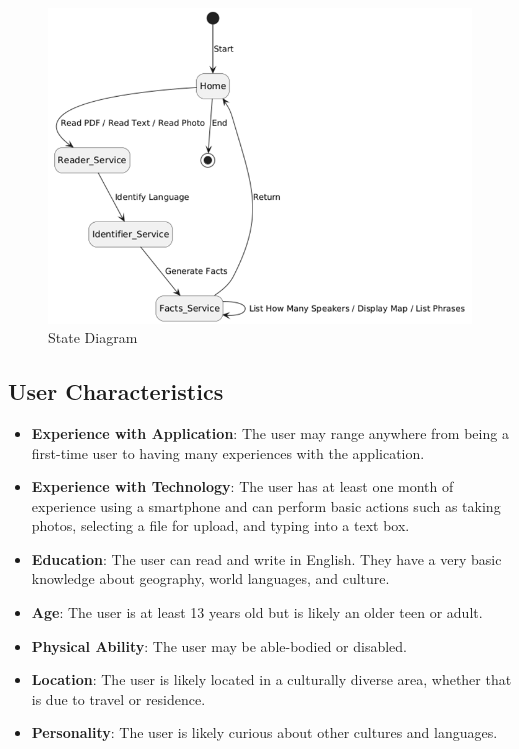 \begin{figure}[H]
	\centering
	\includegraphics{Section2/State_Diagram.png}
	\caption{State Diagram}
	\label{StateDiagram}
\end{figure}


\subsection{User Characteristics}
\label{sub:user_characteristics}
\begin{itemize}
	\item \textbf{Experience with Application}: The user may range anywhere from being a first-time user to having many experiences with the application.
	\item \textbf{Experience with Technology}: The user has at least one month of experience using a smartphone and can perform basic actions such as taking photos, selecting a file for upload, and typing into a text box.
	\item \textbf{Education}: The user can read and write in English. They have a very basic knowledge about geography, world languages, and culture. 
	\item \textbf{Age}: The user is at least 13 years old but is likely an older teen or adult.
	\item \textbf{Physical Ability}:  The user may be able-bodied or disabled.
	\item \textbf{Location}: The user is likely located in a culturally diverse area, whether that is due to travel or residence.
	\item \textbf{Personality}: The user is likely curious about other cultures and languages.
\end{itemize}

